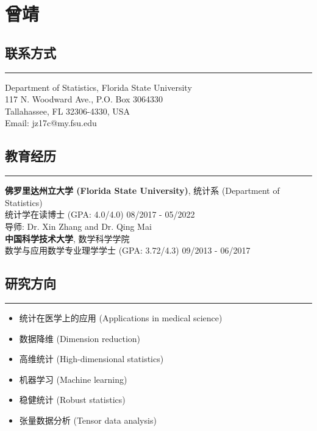 \documentclass[10pt, oneside]{article}
\title{\vspace{-5em}}
\date{}
\begin{document}
\maketitle

\section*{曾靖}
\vspace{10pt}

\subsection*{联系方式}
\noindent\rule{\textwidth}{1pt}
Department of Statistics, Florida State University\\
117 N. Woodward Ave., P.O. Box 3064330\\
Tallahassee, FL 32306-4330, USA\\
Email: jz17c@my.fsu.edu

\subsection*{教育经历}
\noindent\rule{\textwidth}{1pt}
\textbf{佛罗里达州立大学 (Florida State University)}, 统计系 (Department of Statistics)\\
统计学在读博士 (GPA: 4.0/4.0) \hfill 08/2017 - 05/2022\\
导师: Dr. Xin Zhang and Dr. Qing Mai\\[-2mm]

\textbf{中国科学技术大学}, 数学科学学院\\
数学与应用数学专业理学学士 (GPA: 3.72/4.3) \hfill 09/2013 - 06/2017

\subsection*{研究方向}
\noindent\rule{\textwidth}{1pt}
\vspace{-6mm}
\begin{itemize}[itemsep=-1pt]
    \item 统计在医学上的应用 (Applications in medical science)
    \item 数据降维 (Dimension reduction)
    \item 高维统计 (High-dimensional statistics)
    \item 机器学习 (Machine learning)
    \item 稳健统计 (Robust statistics)
    \item 张量数据分析 (Tensor data analysis)
\end{itemize}
\end{document}
